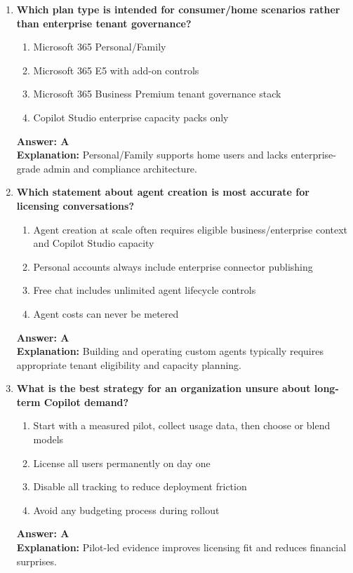 \documentclass[10pt]{article}
\begin{document}
\begin{enumerate}[leftmargin=*]
\item \textbf{Which plan type is intended for consumer/home scenarios rather than enterprise tenant governance?}
\begin{enumerate}[label=\Alph*.]
  \item Microsoft 365 Personal/Family
  \item Microsoft 365 E5 with add-on controls
  \item Microsoft 365 Business Premium tenant governance stack
  \item Copilot Studio enterprise capacity packs only
\end{enumerate}
\textbf{Answer: A}\\
\textbf{Explanation:} Personal/Family supports home users and lacks enterprise-grade admin and compliance architecture.

\item \textbf{Which statement about agent creation is most accurate for licensing conversations?}
\begin{enumerate}[label=\Alph*.]
  \item Agent creation at scale often requires eligible business/enterprise context and Copilot Studio capacity
  \item Personal accounts always include enterprise connector publishing
  \item Free chat includes unlimited agent lifecycle controls
  \item Agent costs can never be metered
\end{enumerate}
\textbf{Answer: A}\\
\textbf{Explanation:} Building and operating custom agents typically requires appropriate tenant eligibility and capacity planning.

\item \textbf{What is the best strategy for an organization unsure about long-term Copilot demand?}
\begin{enumerate}[label=\Alph*.]
  \item Start with a measured pilot, collect usage data, then choose or blend models
  \item License all users permanently on day one
  \item Disable all tracking to reduce deployment friction
  \item Avoid any budgeting process during rollout
\end{enumerate}
\textbf{Answer: A}\\
\textbf{Explanation:} Pilot-led evidence improves licensing fit and reduces financial surprises.


\end{enumerate}
\end{document}
